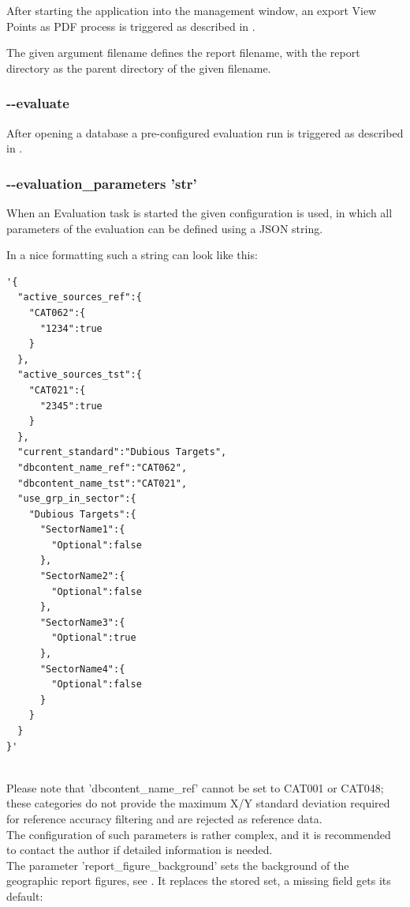 After starting the application into the management window, an export View Points as PDF process is triggered as described in
.

The given argument filename defines the report filename, with the report directory as the parent directory of the given filename.

\subsubsection{-{}-evaluate}

After opening a database a pre-configured evaluation run is triggered as described in .

\subsubsection{-{}-evaluation\_parameters 'str'}

When an Evaluation task is started the given configuration is used, in which all parameters of the evaluation can be defined using a JSON string.

In a nice formatting such a string can look like this:
\begin{lstlisting}[basicstyle=\small\ttfamily]
'{
  "active_sources_ref":{
    "CAT062":{
      "1234":true
    }
  },
  "active_sources_tst":{
    "CAT021":{
      "2345":true
    }
  },
  "current_standard":"Dubious Targets",
  "dbcontent_name_ref":"CAT062",
  "dbcontent_name_tst":"CAT021",
  "use_grp_in_sector":{
    "Dubious Targets":{
      "SectorName1":{
        "Optional":false
      },
      "SectorName2":{
        "Optional":false
      },
      "SectorName3":{
        "Optional":true
      },
      "SectorName4":{
        "Optional":false
      }
    }
  }
}'
\end{lstlisting}
\ \\

Please note that 'dbcontent\_name\_ref' cannot be set to CAT001 or CAT048; these categories do not provide the maximum X/Y standard deviation required for reference accuracy filtering and are rejected as reference data. \\

The configuration of such parameters is rather complex, and it is recommended to contact the author if detailed information is needed. \\

The parameter 'report\_figure\_background' sets the background of the geographic report figures, see . It replaces the stored set, a missing field gets its default:

